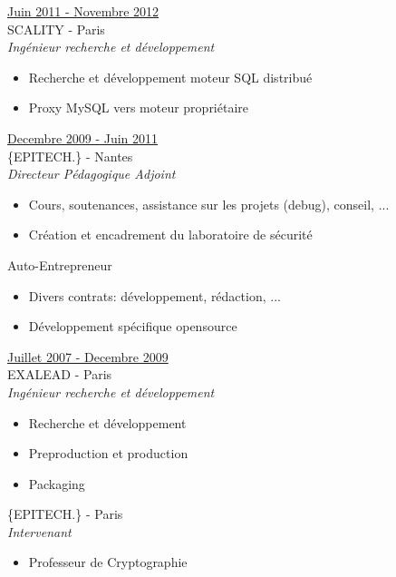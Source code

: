 \documentclass[a4paper,10pt]{letter}
\begin{document}
\begin{description}
		        \item{\underline{Juin 2011 - Novembre 2012}}\\
				SCALITY - Paris\\
				\textit{Ing\'enieur recherche et d\'eveloppement}
				\begin{itemize}
					\item Recherche et d\'eveloppement moteur SQL distribu\'e
                    \item Proxy MySQL vers moteur propri\'etaire\\
				\end{itemize}

			\item{\underline{Decembre 2009 - Juin 2011}}\\
				\{EPITECH.\} - Nantes\\
				\textit{Directeur P\'edagogique Adjoint}
				\begin{itemize}
					\item Cours, soutenances, assistance sur les projets (debug), conseil, ...
					\item Cr\'eation et encadrement du laboratoire de s\'ecurit\'e\\
				\end{itemize}

				Auto-Entrepreneur
				\begin{itemize}
					\item Divers contrats: d\'eveloppement,
						r\'edaction, ...
					\item D\'eveloppement sp\'ecifique opensource\\
				\end{itemize}

			\item{\underline{Juillet 2007 - Decembre 2009}}\\
				EXALEAD - Paris\\
				\textit{Ing\'enieur recherche et d\'eveloppement}
				\begin{itemize}
					\item Recherche et d\'eveloppement
					\item Preproduction et production
					\item Packaging\\
				\end{itemize}

 				\{EPITECH.\} - Paris\\
				\textit{Intervenant}
				\begin{itemize}
					\item Professeur de Cryptographie\\
				\end{itemize}


\end{description}
\end{document}
